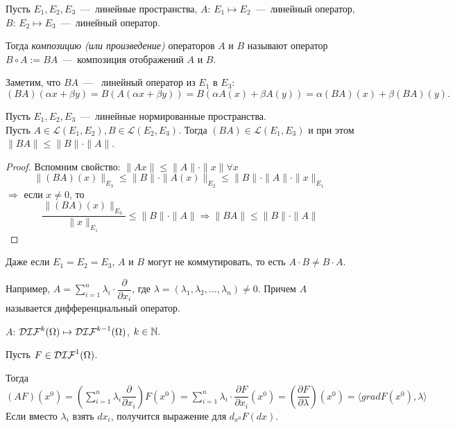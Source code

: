 \begin{definition}
    Пусть $E_1, E_2, E_3$~---~линейные пространства, $A$: $E_1 \mapsto E_2$~---~линейный оператор, $B$: $E_2 \mapsto E_3$~---~линейный оператор.

    Тогда \textit{композицию (или произведение)} операторов $A \text{ и } B$ называют оператор $B \circ A := BA$~---~композиция отображений $A$ и $B$.
\end{definition}

\begin{note}
    Заметим, что $BA$~---~ линейный оператор из $E_1$ в $E_3$:
    \[(BA)(\alpha x + \beta y) = B( A(\alpha x + \beta y) ) = B( \alpha A(x) + \beta A(y)) = \alpha (BA)(x) + \beta (BA)(y).\]
\end{note}

\begin{lemma}
    Пусть $E_1, E_2, E_3$~---~линейные нормированные пространства. \\ Пусть $A \in \mathcal{L}(E_1, E_2), B \in \mathcal{L}(E_2, E_3)$. Тогда $(BA) \in \mathcal{L}(E_1, E_3)$ и при этом $\|BA\| \leq \|B\| \cdot \|A\|$.
\end{lemma}

\begin{proof}
    Вспомним свойство: $\| Ax \| \leq \|A\| \cdot \| x \| \forall x$
    \[\|(BA)(x)\|_{E_3} \leq \|B\| \cdot \|A(x)\|_{E_2} \leq \|B\| \cdot \|A\| \cdot \|x\|_{E_1}\]
    $\Rightarrow$ если $x \neq 0$, то 
    \[\frac{\|(BA)(x)\|_{E_3}}{\|x\|_{E_1}} \leq \|B\| \cdot \|A\| \Rightarrow \|BA\| \leq \|B\| \cdot \|A\|\]
\end{proof}

\begin{remark}
    Даже если $E_1 = E_2 = E_3$, $A$ и $B$ могут не коммутировать, то есть $A \cdot B \neq B \cdot A$.

    Например, $A = \sum_{i = 1}^n \lambda_i \cdot \dfrac{\partial }{\partial x_i}$, где $\lambda = (\lambda_1, \lambda_2, \ldots, \lambda_n) \neq 0$. Причем $A$ называется дифференциальный оператор.

    $A$: $\mathcal{DIF}^k(\Omega) \mapsto \mathcal{DIF}^{k-1}(\Omega)$, $k \in \mathbb{N}.$ 
\end{remark}

\begin{note}
    Пусть $F \in \mathcal{DIF}^1(\Omega)$.

    Тогда $(AF)(x^0) = \left(\sum_{i = 1}^n \lambda_i \dfrac{\partial}{\partial x_i} \right) F(x^0) = \sum_{i = 1}^n \lambda_i \cdot \dfrac{\partial F}{\partial x_i}(x^0) = \left(\dfrac{\partial F}{\partial \lambda}\right)(x^0) = \langle grad F(x^0), \lambda \rangle$
    Если вместо $\lambda_i$ взять $dx_i$, получится выражение для $d_{x^0}F(dx)$.
\end{note}
